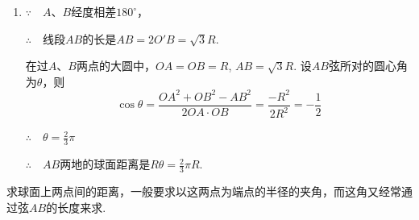 \begin{solution}
\begin{enumerate}[(1)]
\begin{minipage}{.45\textwidth}
\begin{tikzpicture}[]
\end{tikzpicture}
\end{minipage}
    
\item $\because\quad A$、$B$经度相差$180^{\circ}$，

$\therefore\quad$线段$AB$的长是$AB=2O'B=\sqrt{3}R$.

在过$A$、$B$两点的大圆中，$OA=OB=R$, $AB=\sqrt{3}R$. 设$AB$弦所对的圆心角为$\theta$，则
\[\cos\theta=\frac{OA^2+OB^2-AB^2}{2OA\cdot OB}=\frac{-R^2}{2R^2}=-\frac{1}{2}\]

$\therefore\quad \theta=\frac{2}{3}\pi$

$\therefore\quad AB$两地的球面距离是$R\theta=\frac{2}{3}\pi R$.


\end{enumerate}
\end{solution}

\begin{remark}
    求球面上两点间的距离，一般要求以这两点为端点的半径的夹角，而这角又经常通过弦$AB$的长度来求.
\end{remark}

